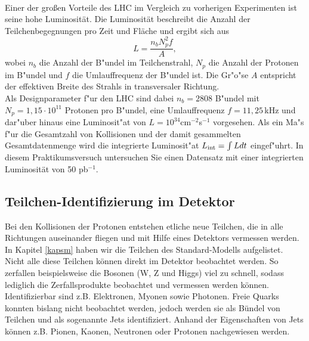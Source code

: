 \\
Einer der großen Vorteile des LHC im Vergleich zu vorherigen Experimenten ist seine hohe Luminosität. Die Luminosität beschreibt die Anzahl der Teilchenbegegnungen pro Zeit und Fläche und ergibt sich aus
\begin{equation}
L=\frac{n_{b}N_{p}^{2}f}{A},
\end{equation}
wobei $n_{b}$ die Anzahl der B"undel im Teilchenstrahl, $N_{p}$ die Anzahl der Protonen im B"undel und $f$ die Umlauffrequenz der B"undel ist. Die Gr"o"se $A$ entspricht der effektiven Breite des Strahls in transversaler Richtung.\\
Als Designparameter f"ur den LHC sind dabei $n_{b}=2808$ B"undel mit $N_{p}=1,15\cdot 10^{11}$ Protonen pro B"undel, eine Umlauffrequenz $f=11,25$\,kHz und dar"uber hinaus eine Luminosit"at von $L=10^{34}$cm$^{-2}$s$^{-1}$ vorgesehen. Als ein Ma"s f"ur die Gesamtzahl von Kollisionen und der damit gesammelten Gesamtdatenmenge wird die integrierte Luminosit"at $L_{\rm{int}}=\int L dt$ eingef"uhrt. In diesem Praktikumsversuch untersuchen Sie einen Datensatz mit einer integrierten Luminosit\"at von 50 pb$^{-1}$.




\subsection{Teilchen-Identifizierung im Detektor}
Bei den Kollisionen der Protonen entstehen etliche neue Teilchen, die in alle Richtungen auseinander fliegen und mit Hilfe eines Detektors vermessen werden. In Kapitel \ref{kapsm} haben wir die Teilchen des Standard-Modells aufgelistet. Nicht alle diese Teilchen k\"onnen direkt im Detektor beobachtet werden. So zerfallen beispielsweise die Bosonen (W, Z und Higgs) viel zu schnell, sodass lediglich die Zerfallsprodukte beobachtet und vermessen werden k\"onnen. Identifizierbar sind z.B. Elektronen, Myonen sowie Photonen. Freie Quarks konnten bislang nicht beobachtet werden, jedoch werden sie als B\"undel von Teilchen und als sogenannte Jets identifiziert. Anhand der Eigenschaften von Jets k\"onnen z.B. Pionen, Kaonen, Neutronen oder Protonen nachgewiesen werden.

